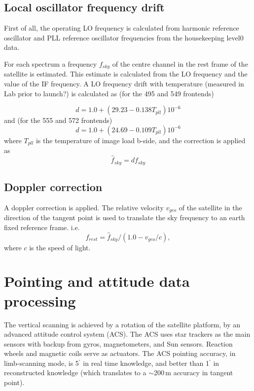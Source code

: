 \subsection{Local oscillator frequency drift}

First of all, the operating LO frequency is calculated
from harmonic reference oscillator and PLL reference oscillator 
frequencies from the housekeeping level0 data.

For each spectrum a frequency \(f_{sky}\) of the centre channel in 
the rest frame of the satellite is estimated.
This estimate is calculated from the LO frequency and the 
value of the IF frequency.
A LO frequency drift with temperature (measured in Lab prior to launch?) 
is calculated as (for the 495 and 549 frontends)

\begin{equation}
  d = 1.0+(29.23-0.138T_{pll})10^{-6}
\end{equation}
and (for the 555 and 572 frontends)
\begin{equation}
  d = 1.0+(24.69-0.109T_{pll})10^{-6}
\end{equation}
where \(T_{pll}\) is the temperature of image load b-side,
and the correction is applied as
\begin{equation}
 \hat{f}_{sky}= d f_{sky}
\end{equation}



\subsection{Doppler correction}

A doppler correction is applied.
The relative velocity \(v_{geo}\) of the satellite in the direction
of the tangent point is used to translate the sky frequency to an 
earth fixed reference frame. i.e.
\begin{equation}
f_{rest} = \hat{f}_{sky}/(1.0 - v_{geo}/c),
\end{equation}
where \(c\) is the speed of light.

\section{Pointing and attitude data processing}

The vertical scanning is achieved by a rotation of the satellite
platform, by an advanced attitude control system (ACS). 
The ACS uses star trackers as the main sensors with backup from gyros, 
magnetometers, and Sun sensors. Reaction wheels and magnetic coils serve as 
actuators. The ACS pointing accuracy, in limb-scanning mode, is 5\(^{'}\) in
real time knowledge, and better than 1\(^{'}\) in reconstructed knowledge
(which translates to a \(\sim\)200\,m accuracy in tangent point).

